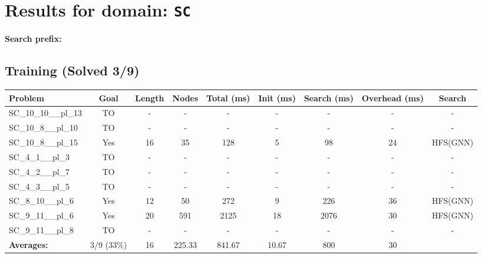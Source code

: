 \documentclass{article}
\begin{document}
\section*{Results for domain: \texttt{SC}}
\textbf{Search prefix:} 
\\[0.5cm]
\subsection*{Training (Solved 3/9)}
\begin{tabular}{lcccccccc}
\toprule
Problem & Goal & Length & Nodes & Total (ms) & Init (ms) & Search (ms) & Overhead (ms) & Search \\
\midrule
SC\_10\_10\_\_pl\_13 & TO & - & - & - & - & - & - & - \\
SC\_10\_8\_\_pl\_10 & TO & - & - & - & - & - & - & - \\
SC\_10\_8\_\_pl\_15 & Yes & 16 & 35 & 128 & 5 & 98 & 24 & HFS(GNN) \\
SC\_4\_1\_\_pl\_3 & TO & - & - & - & - & - & - & - \\
SC\_4\_2\_\_pl\_7 & TO & - & - & - & - & - & - & - \\
SC\_4\_3\_\_pl\_5 & TO & - & - & - & - & - & - & - \\
SC\_8\_10\_\_pl\_6 & Yes & 12 & 50 & 272 & 9 & 226 & 36 & HFS(GNN) \\
SC\_9\_11\_\_pl\_6 & Yes & 20 & 591 & 2125 & 18 & 2076 & 30 & HFS(GNN) \\
SC\_9\_11\_\_pl\_8 & TO & - & - & - & - & - & - & - \\
\textbf{Averages:} & 3/9 (33\%) & 16 & 225.33 & 841.67 & 10.67 & 800 & 30 & \\
\bottomrule
\end{tabular}
\\[0.7cm]
\end{document}
